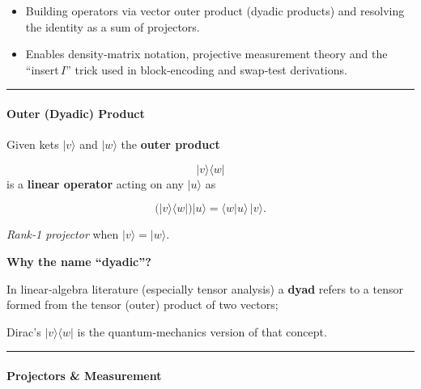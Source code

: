 \begin{itemize}
\item
  Building operators via vector outer product (dyadic products) and
  resolving the identity as a sum of projectors.
\item
  Enables density‑matrix notation, projective measurement theory and the
  ``insert\,\(I\)'' trick used in block‑encoding and swap‑test
  derivations.
\end{itemize}

\begin{center}\rule{0.5\linewidth}{0.5pt}\end{center}

\hypertarget{outer-dyadic-product}{%
\paragraph{Outer (Dyadic) Product}\label{outer-dyadic-product}}

Given kets \(\lvert v\rangle\) and \(\lvert w\rangle\) the \textbf{outer
product}

\[
\boxed{\;
\lvert v\rangle\langle w\rvert
\;}
\] is a \textbf{linear operator} acting on any \(\lvert u\rangle\) as

\[
\bigl(\lvert v\rangle\langle w\rvert\bigr)\lvert u\rangle
= \langle w|u\rangle \, \lvert v\rangle .
\]

\emph{Rank‑1 projector} when \(\lvert v\rangle=\lvert w\rangle\).

\textbf{Why the name ``dyadic''?}

In linear‑algebra literature (especially tensor analysis) a
\textbf{dyad} refers to a tensor formed from the tensor (outer) product
of two vectors;

Dirac's \(\lvert v\rangle\!\langle w\rvert\) is the quantum‑mechanics
version of that concept.

\begin{center}\rule{0.5\linewidth}{0.5pt}\end{center}

\hypertarget{projectors-measurement}{%
\paragraph{Projectors \& Measurement}\label{projectors-measurement}}

